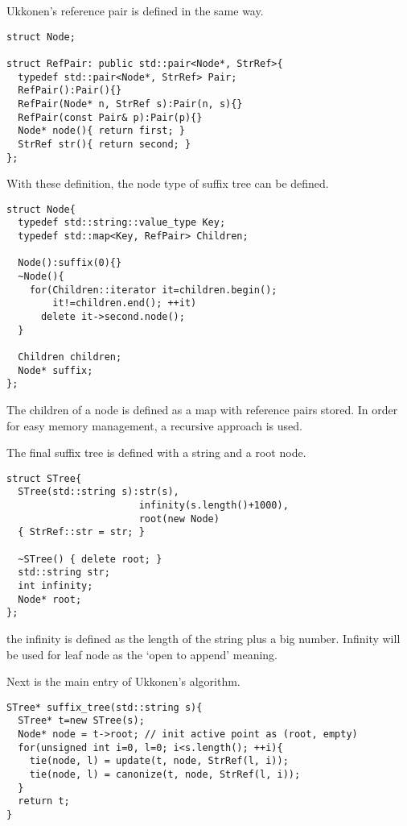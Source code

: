 \documentclass{article}
\begin{document}
Ukkonen's reference pair is defined in the same way.

\begin{lstlisting}
struct Node;

struct RefPair: public std::pair<Node*, StrRef>{
  typedef std::pair<Node*, StrRef> Pair;
  RefPair():Pair(){}
  RefPair(Node* n, StrRef s):Pair(n, s){}
  RefPair(const Pair& p):Pair(p){}
  Node* node(){ return first; }
  StrRef str(){ return second; }
};
\end{lstlisting}

With these definition, the node type of suffix tree
can be defined.

\begin{lstlisting}
struct Node{
  typedef std::string::value_type Key;
  typedef std::map<Key, RefPair> Children;

  Node():suffix(0){}
  ~Node(){
    for(Children::iterator it=children.begin();
        it!=children.end(); ++it)
      delete it->second.node();
  }

  Children children;
  Node* suffix;
};
\end{lstlisting}

The children of a node is defined as a map with reference pairs stored.
In order for easy memory management, a recursive approach is used.

The final suffix tree is defined with a string and a root node.

\begin{lstlisting}
struct STree{
  STree(std::string s):str(s), 
                       infinity(s.length()+1000), 
                       root(new Node)
  { StrRef::str = str; }

  ~STree() { delete root; }
  std::string str;
  int infinity;
  Node* root;
};
\end{lstlisting}

the infinity is defined as the length of the string plus a big number.
Infinity will be used for leaf node as the `open to append' meaning.

Next is the main entry of Ukkonen's algorithm.

\begin{lstlisting}
STree* suffix_tree(std::string s){
  STree* t=new STree(s);
  Node* node = t->root; // init active point as (root, empty)
  for(unsigned int i=0, l=0; i<s.length(); ++i){
    tie(node, l) = update(t, node, StrRef(l, i));
    tie(node, l) = canonize(t, node, StrRef(l, i));
  }
  return t;
}
\end{lstlisting}
\end{document}
